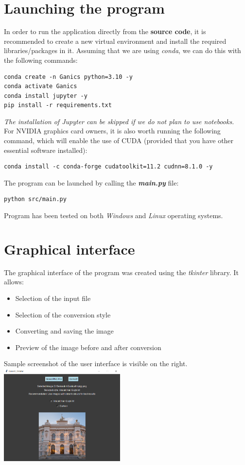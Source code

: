 \documentclass{article}
\begin{document}
\section{Launching the program}
In order to run the application directly from the \textbf{source code}, it is recommended to create a new virtual environment and install the required libraries/packages in it.
Assuming that we are using \textit{conda}, we can do this with the following commands:
\begin{verbatim}
conda create -n Ganics python=3.10 -y
conda activate Ganics
conda install jupyter -y
pip install -r requirements.txt
\end{verbatim}
\textit{The installation of Jupyter can be skipped if we do not plan to use notebooks.}
\vspace{3mm} \\
For NVIDIA graphics card owners, it is also worth running the following command, which will enable the use of CUDA (provided that you have other essential software installed):
\begin{verbatim}
conda install -c conda-forge cudatoolkit=11.2 cudnn=8.1.0 -y
\end{verbatim}
The program can be launched by calling the \textbf{\textit{main.py}} file:
\begin{verbatim}
python src/main.py
\end{verbatim}
Program has been tested on both \textit{Windows} and \textit{Linux} operating systems.

\section{Graphical interface}
\begin{multicols}{2}
The graphical interface of the program was created using the \textit{tkinter} library. It allows:
\begin{itemize}
    \setlength\itemsep{0pt}
    \item Selection of the input file
    \item Selection of the conversion style
    \item Converting and saving the image
    \item Preview of the image before and after conversion
\end{itemize}
Sample screenshot of the user interface is visible on the right.
\vspace{5\baselineskip} \\
\columnbreak
\includegraphics[width=0.475\textwidth]{../imgs/gui.png}
\end{multicols}
\end{document}
